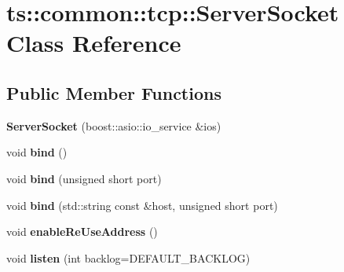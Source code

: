 \hypertarget{classts_1_1common_1_1tcp_1_1_server_socket}{}\section{ts\+:\+:common\+:\+:tcp\+:\+:Server\+Socket Class Reference}
\label{classts_1_1common_1_1tcp_1_1_server_socket}
\subsection*{Public Member Functions}
\begin{DoxyCompactItemize}
\item 
\mbox{\label{classts_1_1common_1_1tcp_1_1_server_socket_a7037c67db7f87b5bc1189c30a74acd10}} 
{\bfseries Server\+Socket} (boost\+::asio\+::io\+\_\+service \&ios)
\item 
\mbox{\label{classts_1_1common_1_1tcp_1_1_server_socket_ac8b82e1258042540a616e93d86d90a65}} 
void {\bfseries bind} ()
\item 
\mbox{\label{classts_1_1common_1_1tcp_1_1_server_socket_a9c14b102664ee2a4417064cf3aa5f0b2}} 
void {\bfseries bind} (unsigned short port)
\item 
\mbox{\label{classts_1_1common_1_1tcp_1_1_server_socket_ab95c54ec9cb464b792bd35513a133259}} 
void {\bfseries bind} (std\+::string const \&host, unsigned short port)
\item 
\mbox{\label{classts_1_1common_1_1tcp_1_1_server_socket_a7e608369b093424bcccebef30d634625}} 
void {\bfseries enable\+Re\+Use\+Address} ()
\item 
\mbox{\label{classts_1_1common_1_1tcp_1_1_server_socket_a97fc3130a40289d44288b65a0d291006}} 
void {\bfseries listen} (int backlog=D\+E\+F\+A\+U\+L\+T\+\_\+\+B\+A\+C\+K\+L\+OG)
\item 
\mbox{\label{classts_1_1common_1_1tcp_1_1_server_socket_a41e1715186ecb0d0f9491e96de05fa75}} 

\end{DoxyCompactItemize}
